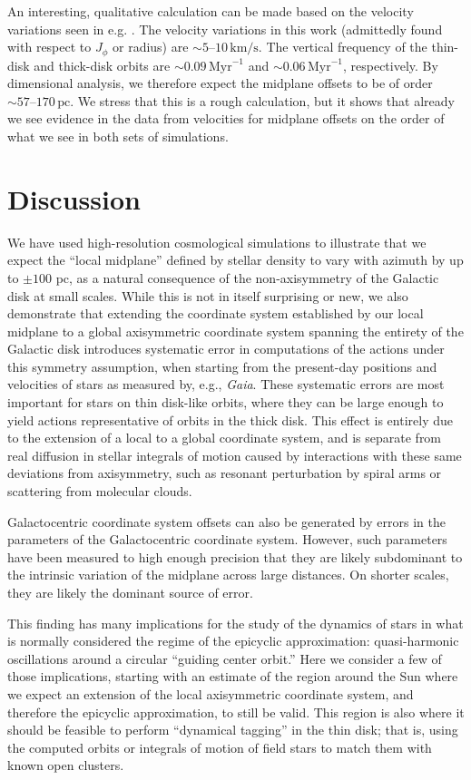 \documentclass[twocolumn]{aastex62}
\newcommand{\pc}{\text{pc}}
\newcommand{\Myr}{\text{Myr}}
\newcommand{\kms}{\text{km}/\text{s}}
\begin{document}
An interesting, qualitative calculation can be made based on the velocity
variations seen in e.g. \citet{2019arXiv190209569F}. The velocity variations
in this work (admittedly found with respect to $J_{\phi}$ or radius) are
$\sim5\text{--}10\,\kms$. The vertical frequency of the thin-disk and
thick-disk orbits are $\sim 0.09\,\Myr^{-1}$ and $\sim0.06\,\Myr^{-1}$,
respectively. By dimensional analysis, we therefore expect the midplane
offsets to be of order $\sim 57\text{--}170\,\pc$. We stress that this is a
rough calculation, but it shows that already we see evidence in the data from
velocities for midplane offsets on the order of what we see in both sets of
simulations.

\section{Discussion} \label{sec:discussion}
We have used high-resolution cosmological simulations to illustrate that we
expect the ``local midplane'' defined by stellar density to vary with azimuth
by up to $\pm 100$ pc, as a natural consequence of the non-axisymmetry of the
Galactic disk at small scales. While this is not in itself surprising or new,
we also demonstrate that extending the coordinate system established by our
local midplane to a global axisymmetric coordinate system spanning the
entirety of the Galactic disk introduces systematic error in computations of
the actions under this symmetry assumption, when starting from the present-day
positions and velocities of stars as measured by, e.g., \emph{Gaia}. These
systematic errors are most important for stars on thin disk-like orbits, where
they can be large enough to yield actions representative of orbits in the
thick disk. This effect is entirely due to the extension of a local to a
global coordinate system, and is separate from real diffusion in stellar
integrals of motion caused by interactions with these same deviations from
axisymmetry, such as resonant perturbation by spiral arms or scattering from
molecular clouds. 

Galactocentric coordinate system offsets can also be generated by errors in
the parameters of the Galactocentric coordinate system. However, such
parameters have been measured to high enough precision that they are likely
subdominant to the intrinsic variation of the midplane across large distances.
On shorter scales, they are likely the dominant source of error.

This finding has many implications for the study of the dynamics of stars in
what is normally considered the regime of the epicyclic approximation:
quasi-harmonic oscillations around a circular ``guiding center orbit.'' Here
we consider a few of those implications, starting with an estimate of the
region around the Sun where we expect an extension of the local axisymmetric
coordinate system, and therefore the epicyclic approximation, to still be
valid. This region is also where it should be feasible to perform ``dynamical
tagging'' in the thin disk; that is, using the computed orbits or integrals of
motion of field stars to match them with known open clusters.
\end{document}
